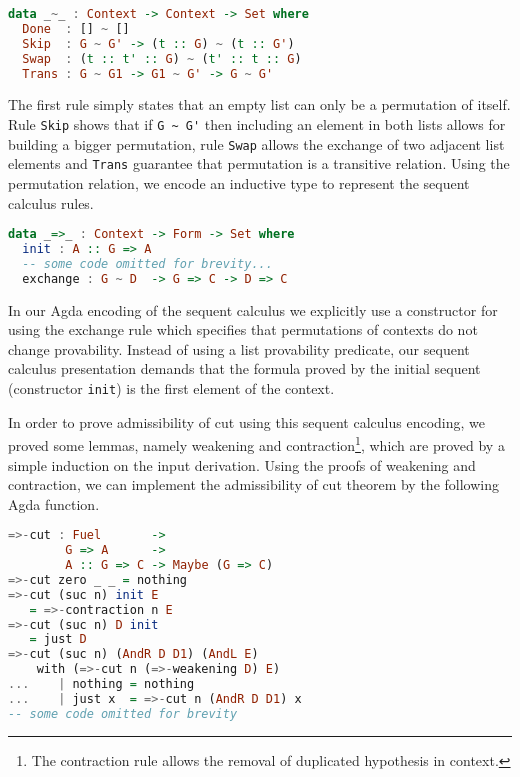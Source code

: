 \begin{lstlisting}[language=haskell]
data _~_ : Context -> Context -> Set where
  Done  : [] ~ []
  Skip  : G ~ G' -> (t :: G) ~ (t :: G')
  Swap  : (t :: t' :: G) ~ (t' :: t :: G)
  Trans : G ~ G1 -> G1 ~ G' -> G ~ G'
\end{lstlisting}

The first rule simply states that an empty list can only be a permutation of itself. Rule \lstinline|Skip|
shows that if \lstinline|G ~ G'| then including an element in both lists allows for building a bigger
permutation, rule \lstinline|Swap| allows the exchange of two adjacent list elements and \lstinline|Trans|
guarantee that permutation is a transitive relation. Using the permutation relation, we encode an
inductive type to represent the sequent calculus rules.

\begin{lstlisting}[language=haskell]
data _=>_ : Context -> Form -> Set where
  init : A :: G => A
  -- some code omitted for brevity...
  exchange : G ~ D  -> G => C -> D => C
\end{lstlisting}

In our Agda encoding of the sequent calculus we explicitly use a constructor for using the exchange rule
which specifies that permutations of contexts do not change provability. Instead of using a list provability
predicate, our sequent calculus presentation demands that the formula proved by the initial sequent
(constructor \lstinline|init|) is the first element of the context.


In order to prove admissibility of cut using this sequent calculus encoding, we proved some lemmas, namely weakening
and contraction\footnote{The contraction rule allows the removal of duplicated hypothesis in context.}, which are
proved by a simple induction on the input derivation. Using the proofs of weakening and contraction, we can implement
the admissibility of cut theorem by the following Agda function.



\begin{lstlisting}[language=haskell]
=>-cut : Fuel       ->
        G => A      ->
        A :: G => C -> Maybe (G => C)
=>-cut zero _ _ = nothing
=>-cut (suc n) init E
   = =>-contraction n E
=>-cut (suc n) D init
   = just D
=>-cut (suc n) (AndR D D1) (AndL E)
    with (=>-cut n (=>-weakening D) E)
...    | nothing = nothing
...    | just x  = =>-cut n (AndR D D1) x
-- some code omitted for brevity
\end{lstlisting}



